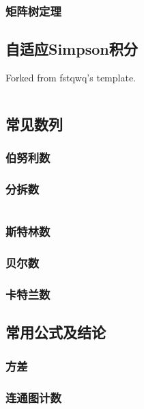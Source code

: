 \documentclass[a4paper]{article}
\begin{document}
\begin{multicols}{2}
				\subsubsection{矩阵树定理}
					

			\subsection{自适应Simpson积分}
				Forked from fstqwq's template.
				\inputminted{cpp}{../src/math/simpson.cpp}

			\subsection{常见数列}
				\subsubsection{伯努利数}
					
				
				\subsubsection{分拆数}
					\inputminted{cpp}{../src/math/分拆数.cpp}
				
				\subsubsection{斯特林数}
					
				
				\subsubsection{贝尔数}
					
				
				\subsubsection{卡特兰数}
					
			
			\subsection{常用公式及结论}
				\subsubsection{方差}
					
				
				\subsubsection{连通图计数}
					


\end{multicols}
\end{document}
